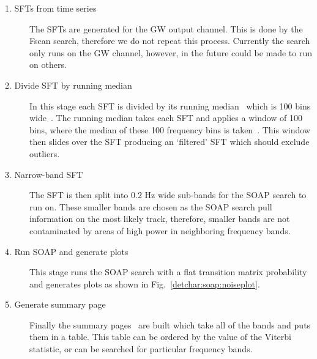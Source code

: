 \begin{description}
	\item[1. \glspl{SFT} from time series] The \glspl{SFT} are generated for the \gls{GW} output channel. This is done by the Fscan search, therefore we do not repeat this process. Currently the search only runs on the \gls{GW} channel, however, in the future could be made to run on others.
	
	\item[2. Divide \gls{SFT} by running median] In this stage each
\gls{SFT} is divided by its running median~ which is 100 bins
wide~. The running median takes each \gls{SFT} and
applies a window of 100 bins, where the median of these 100 frequency bins is
taken~. This window then slides over the
\gls{SFT} producing an `filtered' \gls{SFT} which should exclude
outliers.~
	
        \item[3. Narrow-band \gls{SFT}] The \gls{SFT} is then split into 0.2 Hz
wide sub-bands for the SOAP search to run on. These smaller bands are chosen as
the SOAP search pull~ information on the most likely track, therefore, smaller
bands are not contaminated by areas of high power in neighboring frequency
bands. 
	
        \item[4. Run SOAP and generate plots] This stage runs the SOAP search
with a flat transition matrix probability and generates plots as shown in
Fig.~\ref{detchar:soap:noiseplot}.
	
        \item[5. Generate summary page] Finally the summary pages~ are built
which take all of the bands and puts them in a table. This table can be ordered
by the value of the Viterbi statistic, or can be searched for particular
frequency bands.  
\end{description}

